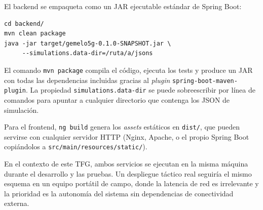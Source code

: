 El backend se empaqueta como un JAR ejecutable estándar de Spring Boot:

\begin{lstlisting}[caption={Compilación y ejecución del backend.}, label={cod:build}]
cd backend/
mvn clean package
java -jar target/gemelo5g-0.1.0-SNAPSHOT.jar \
     --simulations.data-dir=/ruta/a/jsons
\end{lstlisting}

El comando \texttt{mvn package} compila el código, ejecuta los tests y produce un JAR con todas las dependencias
incluidas gracias al \textit{plugin} \texttt{spring-boot-maven-plugin}. La propiedad
\texttt{simulations.data-dir} se puede sobreescribir por línea de comandos para
apuntar a cualquier directorio que contenga los JSON de simulación.

Para el frontend, \texttt{ng build} genera los \textit{assets} estáticos en
\texttt{dist/}, que pueden servirse con cualquier servidor HTTP (Nginx, Apache, o
el propio Spring Boot copiándolos a \texttt{src/main/resources/static/}).

En el contexto de este TFG, ambos servicios se ejecutan en la misma máquina durante
el desarrollo y las pruebas. Un despliegue táctico real seguiría el mismo esquema en
un equipo portátil de campo, donde la latencia de red es irrelevante y la prioridad
es la autonomía del sistema sin dependencias de conectividad externa.
